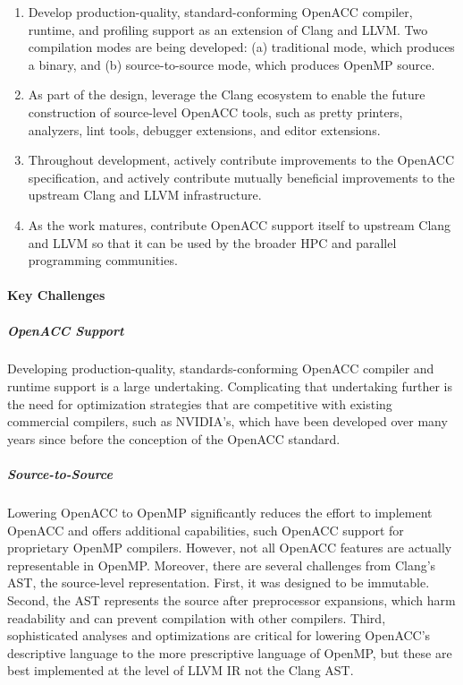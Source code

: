 \begin{enumerate}

\item Develop production-quality, standard-conforming OpenACC
compiler, runtime, and profiling support as an extension of Clang and
LLVM.  Two compilation modes are being developed: (a) traditional
mode, which produces a binary, and (b) source-to-source mode, which
produces OpenMP source.

\item As part of the design, leverage the Clang ecosystem to enable
the future construction of source-level OpenACC tools, such as pretty
printers, analyzers, lint tools, debugger extensions, and editor
extensions.

\item Throughout development, actively contribute improvements to the
OpenACC specification, and actively contribute mutually beneficial
improvements to the upstream Clang and LLVM infrastructure.

\item As the work matures, contribute OpenACC support itself to
upstream Clang and LLVM so that it can be used by the broader HPC and
parallel programming communities.

\end{enumerate}

\paragraph{Key Challenges}

\subparagraph{OpenACC Support} Developing production-quality,
standards-conforming OpenACC compiler and runtime support is a large
undertaking.  Complicating that undertaking further is the need for
optimization strategies that are competitive with existing commercial
compilers, such as NVIDIA's, which have been developed over many years
since before the conception of the OpenACC standard.

\subparagraph{Source-to-Source} Lowering OpenACC to OpenMP
significantly reduces the effort to implement OpenACC and offers
additional capabilities, such OpenACC support for proprietary OpenMP
compilers.  However, not all OpenACC features are actually
representable in OpenMP.  Moreover, there are several challenges from
Clang's AST, the source-level representation.  First, it was designed
to be immutable.  Second, the AST represents the source after
preprocessor expansions, which harm readability and can prevent
compilation with other compilers.  Third, sophisticated analyses and
optimizations are critical for lowering OpenACC's descriptive language
to the more prescriptive language of OpenMP, but these are best
implemented at the level of LLVM IR not the Clang AST.

